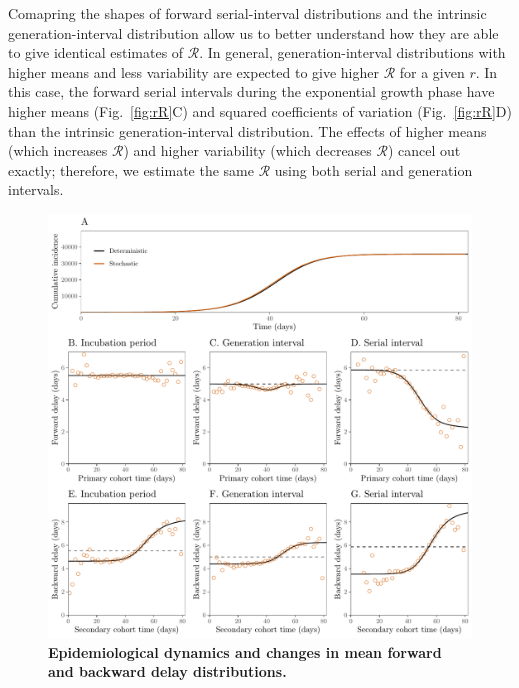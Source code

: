 \documentclass[12pt]{article}
\newcommand{\fref}[1]{Fig.~\ref{fig:#1}}
\begin{document}
Comapring the shapes of forward serial-interval distributions and the intrinsic generation-interval distribution allow us to better understand how they are able to give identical estimates of $\mathcal R$.
In general, generation-interval distributions with higher means and less variability are expected to give higher $\mathcal R$ for a given $r$.
In this case, the forward serial intervals during the exponential growth phase have higher means (\fref{rR}C) and squared coefficients of variation (\fref{rR}D) than the intrinsic generation-interval distribution.
The effects of higher means (which increases $\mathcal R$) and higher variability (which decreases $\mathcal R$) cancel out exactly;
therefore, we estimate the same $\mathcal R$ using both serial and generation intervals.

\begin{figure}[!th]
\includegraphics[width=\textwidth]{forward.pdf}
\caption{
\textbf{Epidemiological dynamics and changes in mean forward and backward delay distributions.}
}
\label{fig:epi}
\end{figure}
\end{document}
